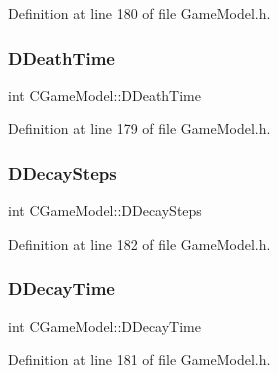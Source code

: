 Definition at line 180 of file Game\+Model.\+h.

\hypertarget{classCGameModel_a2ddf991af7749f946a4fe242b2397b9a}{}\label{classCGameModel_a2ddf991af7749f946a4fe242b2397b9a} 
\subsubsection{\texorpdfstring{D\+Death\+Time}{DDeathTime}}
{\footnotesize\ttfamily int C\+Game\+Model\+::\+D\+Death\+Time\hspace{0.3cm}{\ttfamily [protected]}}



Definition at line 179 of file Game\+Model.\+h.

\hypertarget{classCGameModel_ac4a0ea3659c796b1c4f8b1f91d0e3258}{}\label{classCGameModel_ac4a0ea3659c796b1c4f8b1f91d0e3258} 
\subsubsection{\texorpdfstring{D\+Decay\+Steps}{DDecaySteps}}
{\footnotesize\ttfamily int C\+Game\+Model\+::\+D\+Decay\+Steps\hspace{0.3cm}{\ttfamily [protected]}}



Definition at line 182 of file Game\+Model.\+h.

\hypertarget{classCGameModel_abd062550cd4f0f9286f78f3195fe2f71}{}\label{classCGameModel_abd062550cd4f0f9286f78f3195fe2f71} 
\subsubsection{\texorpdfstring{D\+Decay\+Time}{DDecayTime}}
{\footnotesize\ttfamily int C\+Game\+Model\+::\+D\+Decay\+Time\hspace{0.3cm}{\ttfamily [protected]}}



Definition at line 181 of file Game\+Model.\+h.

\hypertarget{classCGameModel_a30e26a862e4eb282a275ed192017c248}{}\label{classCGameModel_a30e26a862e4eb282a275ed192017c248} 
